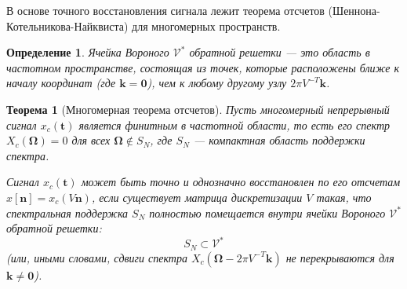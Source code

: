 \documentclass[12pt, a4paper]{article}
\newtheorem{theorem}{Теорема}
\newtheorem{definition}{Определение}
\begin{document}
В основе точного восстановления сигнала лежит теорема отсчетов (Шеннона-Котельникова-Найквиста) для многомерных пространств.

\begin{definition}
Ячейка Вороного $\mathcal{V}^*$ обратной решетки --- это область в частотном пространстве, состоящая из точек, которые расположены ближе к началу координат (где $\mathbf{k}=\mathbf{0}$), чем к любому другому узлу $2\pi V^{-T} \mathbf{k}$.
\end{definition}

\begin{theorem}[Многомерная теорема отсчетов]
Пусть многомерный непрерывный сигнал $x_c(\mathbf{t})$ является финитным в частотной области, то есть его спектр $X_c(\boldsymbol{\Omega}) = 0$ для всех $\boldsymbol{\Omega} \notin S_N$, где $S_N$ --- компактная область поддержки спектра.

Сигнал $x_c(\mathbf{t})$ может быть точно и однозначно восстановлен по его отсчетам $x[\mathbf{n}] = x_c(V \mathbf{n})$, если существует матрица дискретизации $V$ такая, что спектральная поддержка $S_N$ полностью помещается внутри ячейки Вороного $\mathcal{V}^*$ обратной решетки:
$$ S_N \subset \mathcal{V}^* $$
(или, иными словами, сдвиги спектра $X_c(\boldsymbol{\Omega} - 2\pi V^{-T} \mathbf{k})$ не перекрываются для $\mathbf{k} \neq \mathbf{0}$).
\end{theorem}
\end{document}
